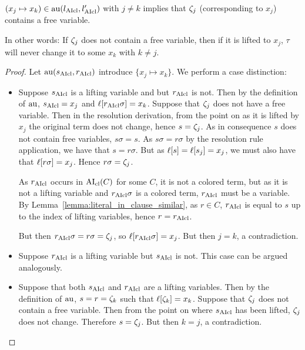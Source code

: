 \documentclass[,%
	paper=a4,%
	DIV14, 
	liststotoc,
	bibtotoc,
	draft=false,%
	numbers=noendperiod
]{scrartcl}
\begin{document}
\begin{lemma}
	\label{lemma:tau_only_for_variable_terms}
	$(x_j \mapsto x_k) \in \operatorname{au}(l_{\operatorname{AIcl}}, l_{\operatorname{AIcl}}')$ with $j\neq k$ implies that $\zeta_{j}$ (corresponding to $x_j$) contains a free variable.

	In other words: If $\zeta_{j}$ does not contain a free variable, then if it is lifted to $x_j$, $\tau$ will never change it to some $x_k$ with $k\neq j$.
\end{lemma}
\begin{proof}
	Let  $\operatorname{au}(s_{\operatorname{AIcl}}, r_{\operatorname{AIcl}})$ introduce $\{x_j \mapsto x_k\}$.
	We perform a case distinction:
	\begin{itemize}
		\item Suppose $s_{\operatorname{AIcl}}$ is a lifting variable and but $r_{\operatorname{AIcl}}$ is not.
			Then by the definition of $\operatorname{au}$, $s_{\operatorname{AIcl}} = x_j$ and $\ell[r_{\operatorname{AIcl}}\sigma] = x_k$.
			Suppose that $\zeta_{j}$ does not have a free variable.
			Then in the resolution derivation, from the point on as it is lifted by $x_j$ the original term does not change, hence $s = \zeta_{j}$. As in consequence $s$ does not contain free variables, $s\sigma = s$.
			As $s\sigma = r\sigma$ by the resolution rule application, we have that $s = r\sigma$.
			But as $\ell[s] = \ell[s_j] = x_j$, we must also have that $\ell[r\sigma] = x_j$.
			Hence $r\sigma = \zeta_{j}$.

			As $r_{\operatorname{AIcl}}$ occurs in $\operatorname{AI}_\mathrm{cl}(C)$ for some $C$, it is not a colored term, but as it is not a lifting variable and $r_{\operatorname{AIcl}}\sigma$ is a colored term, $r_{\operatorname{AIcl}}$ must be a variable.
			By Lemma~\ref{lemma:literal_in_clause_similar}, as $r \in C$, $r_{\operatorname{AIcl}}$ is equal to $s$ up to the index of lifting variables, hence $r = r_{\operatorname{AIcl}}$.

			But then $r_{\operatorname{AIcl}}\sigma = r\sigma = \zeta_{j}$, so $\ell[r_{\operatorname{AIcl}}\sigma] = x_j$. But then $j=k$, a contradiction.

		\item Suppose $r_{\operatorname{AIcl}}$ is a lifting variable but $s_{\operatorname{AIcl}}$ is not. This case can be argued analogously.

		\item Suppose that both $s_{\operatorname{AIcl}}$ and $r_{\operatorname{AIcl}}$ are a lifting variables.
			Then by the definition of $\operatorname{au}$, $s = r = \zeta_{k}$ such that $\ell[\zeta_{k}] = x_k$.
			Suppose that $\zeta_{j}$ does not contain a free variable. Then from the point on where $s_{\operatorname{AIcl}}$ has been lifted, $\zeta_{j}$ does not change. Therefore $s = \zeta_{j}$. But then $k=j$, a contradiction.
			\qedhere
	\end{itemize}
\end{proof}
\end{document}
